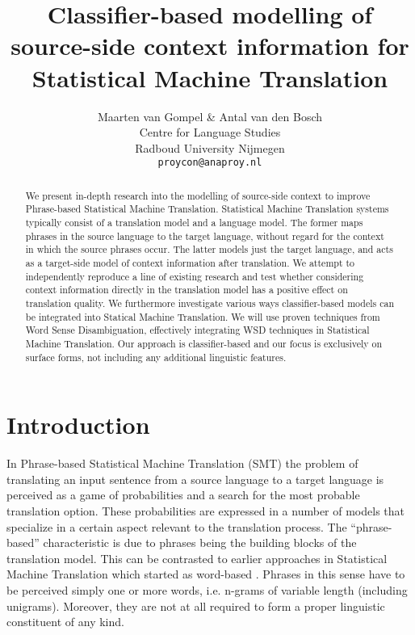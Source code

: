 \documentclass[11pt]{article}
\title{Classifier-based modelling of source-side context information for Statistical Machine Translation}
\author{Maarten van Gompel \& Antal van den Bosch \\
 Centre for Language Studies \\
  Radboud University Nijmegen \\
  {\tt proycon@anaproy.nl}}
\begin{document}
\maketitle

\begin{abstract} 
We present in-depth research into the modelling of source-side
context to improve Phrase-based Statistical Machine Translation. Statistical
Machine Translation systems typically consist of a translation model and a
language model. The former maps phrases in the source language to the target
language, without regard for the context in which the source phrases occur. The
latter models just the target language, and acts as a target-side model of
context information after translation. We attempt to independently reproduce a
line of existing research and test whether considering context information
directly in the translation model has a positive effect on translation quality.
We furthermore investigate various ways classifier-based models can be
integrated into Statical Machine Translation.  We will use proven techniques
from Word Sense Disambiguation, effectively integrating WSD techniques in
Statistical Machine Translation. Our approach is classifier-based and our focus
is exclusively on surface forms, not including any additional linguistic
features. 
\end{abstract}

\section{Introduction}

In Phrase-based Statistical Machine Translation (SMT) the problem of
translating an input sentence from a source language to a target language is
perceived as a game of probabilities and a search for the most probable
translation option.  These probabilities are expressed in a number of models
that specialize in a certain aspect relevant to the translation process. The
``phrase-based'' characteristic is due to phrases being the building blocks of
the translation model. This can be contrasted to earlier approaches in
Statistical Machine Translation which started as word-based \cite{OCHNEY?}.
Phrases in this sense have to be perceived simply one or more words, i.e. n-grams of variable
length (including unigrams). Moreover, they are not at all required to form a proper
linguistic constituent of any kind.
\end{document}

